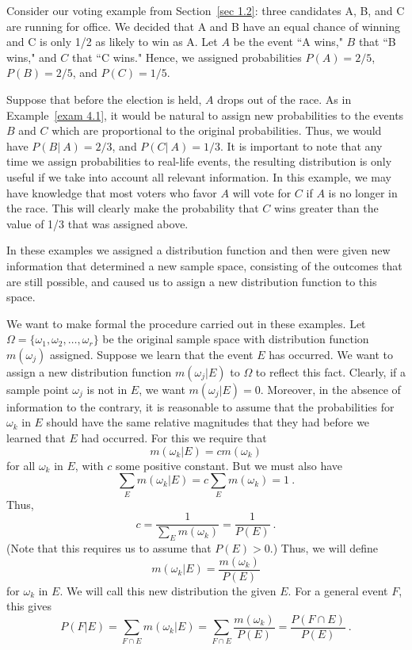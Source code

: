 \begin{example}\label{exam 4.2}
Consider our voting example from Section~\ref{sec 1.2}: three candidates A, B,
and C are running for office.  We decided that A and B have an equal chance of
winning and C is only 1/2 as likely to win as A.  Let $A$ be the event ``A
wins," $B$ that ``B wins," and $C$ that ``C wins."  Hence, we assigned
probabilities $P(A) = 2/5$, $P(B) = 2/5$, and $P(C) = 1/5$.  
\par
Suppose that before the election is held, $A$ drops out of the race.  As in Example~\ref{exam
4.1}, it would be natural to assign new probabilities to the events $B$ and $C$ which are
proportional to the original probabilities.  Thus, we would have $P(B|~A) = 2/3$, and
$P(C|~A) = 1/3$.  It is important to note that any time we assign probabilities to real-life
events, the resulting distribution is only useful if we take into account all relevant
information.  In this example, we may have knowledge that most voters who favor $A$ will vote
for $C$ if $A$ is no longer in the race.  This will clearly make the probability that
$C$ wins greater than the value of 1/3 that was assigned above.
\end{example}

In these examples we assigned a distribution function and then were given new
information that determined a new sample space, consisting of the outcomes that
are still possible, and caused us to assign a new distribution function to this
space.

We want to make formal the procedure carried out in these examples.  Let
$\Omega = \{\omega_1,\omega_2,\dots,\omega_r\}$ be the original sample space
with distribution function $m(\omega_j)$ assigned.  Suppose we learn that the
event $E$ has occurred.  We want to assign a new distribution function
$m(\omega_j|E)$ to $\Omega$ to reflect this fact.  Clearly, if a sample point
$\omega_j$ is not in $E$, we want $m(\omega_j|E) = 0$.  Moreover, in the
absence of information to the contrary, it is reasonable to assume that the
probabilities for $\omega_k$ in $E$ should have the same relative magnitudes
that they had before we learned that $E$ had occurred.  For this we require
that
$$
m(\omega_k|E) = cm(\omega_k)
$$
for all $\omega_k$ in $E$, with $c$ some positive constant.  But we must also
have
$$
\sum_E m(\omega_k|E) = c\sum_E m(\omega_k) = 1\ .
$$
Thus,
$$
c = \frac 1{\sum_E m(\omega_k)} = \frac 1{P(E)}\ .
$$
(Note that this requires us to assume that $P(E) > 0$.)  Thus, we will
define
$$
m(\omega_k|E) = \frac {m(\omega_k)}{P(E)}
$$
for $\omega_k$ in $E$.  We will call this new distribution the  given $E$.  For a general event $F$, this gives
$$
P(F|E) = \sum_{F \cap E} m(\omega_k|E) = \sum_{F \cap E}\frac {m(\omega_k)}{P(E)} = 
\frac {P(F \cap E)}{P(E)}\ .
$$

